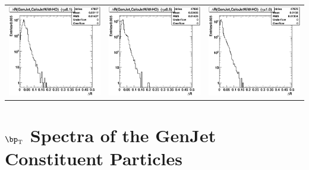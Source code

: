 \documentclass{cmspaper}
\begin{document}
\begin{appendices}
\begin{center}
\begin{tabular}{lll}
 \end{tabular}
\end{center}
\begin{center}
 \begin{tabular}{lll}
  \includegraphics[width=2in]{figs/h_DeltaRWithHO_corr_eta0.1.eps} &
  \includegraphics[width=2in]{figs/h_DeltaRWithHO_corr_eta0.5.eps} &
  \includegraphics[width=2in]{figs/h_DeltaRWithHO_corr_eta1.0.eps} \\
 \end{tabular}
\end{center}


\section{$\bp_\text T$ Spectra of the GenJet Constituent Particles}
\label{app:pT_spect}


\end{appendices}
\end{document}
